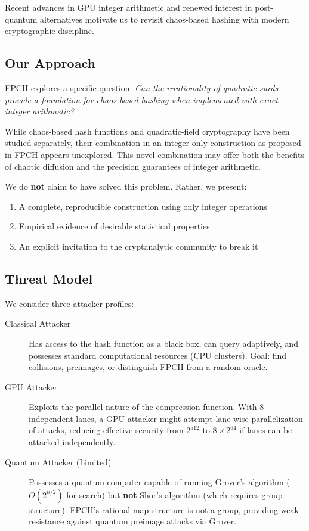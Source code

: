 \documentclass[11pt,a4paper]{article}
\theoremstyle{plain}
\theoremstyle{definition}
\theoremstyle{remark}
\begin{document}
Recent advances in GPU integer arithmetic and renewed interest in post-quantum alternatives motivate us to revisit chaos-based hashing with modern cryptographic discipline.

\subsection{Our Approach}

FPCH explores a specific question: \textit{Can the irrationality of quadratic surds provide a foundation for chaos-based hashing when implemented with exact integer arithmetic?}

While chaos-based hash functions and quadratic-field cryptography have been studied separately, their combination in an integer-only construction as proposed in FPCH appears unexplored. This novel combination may offer both the benefits of chaotic diffusion and the precision guarantees of integer arithmetic.

We do \textbf{not} claim to have solved this problem. Rather, we present:
\begin{enumerate}
    \item A complete, reproducible construction using only integer operations
    \item Empirical evidence of desirable statistical properties
    \item An explicit invitation to the cryptanalytic community to break it
\end{enumerate}

\subsection{Threat Model}\label{sec:threat}

We consider three attacker profiles:

\begin{description}
    \item[Classical Attacker] Has access to the hash function as a black box, can query adaptively, and possesses standard computational resources (CPU clusters). Goal: find collisions, preimages, or distinguish FPCH from a random oracle.
    
    \item[GPU Attacker] Exploits the parallel nature of the compression function. With 8 independent lanes, a GPU attacker might attempt lane-wise parallelization of attacks, reducing effective security from $2^{512}$ to $8 \times 2^{64}$ if lanes can be attacked independently.
    
    \item[Quantum Attacker (Limited)] Possesses a quantum computer capable of running Grover's algorithm ($O(2^{n/2})$ for search) but \textbf{not} Shor's algorithm (which requires group structure). FPCH's rational map structure is not a group, providing weak resistance against quantum preimage attacks via Grover.
\end{description}
\end{document}
